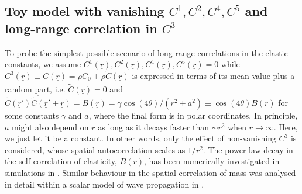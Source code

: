 \documentclass[twoside,twocolumn,9pt]{article}
\begin{document}
\subsection{Toy model with vanishing $C^1, C^2, C^4, C^5$ and long-range correlation in $C^3$}
To probe the simplest possible scenario of long-range correlations in the elastic constants, we assume $C^1(\underline{r}),C^2(\underline{r}),C^4(\underline{r}),C^5(\underline{r})=0$ while $C^3(\underline{r})\equiv C(\underline{r})=\rho C_0+\rho\tilde{C}(\underline{r})$ is expressed in terms of its mean value plus a random part, i.e. $\overline{\tilde{C}(\underline{r})}=0$ and $\overline{\tilde{C}(\underline{r}')\tilde{C}(\underline{r}'+\underline{r})}=B(\underline{r})=\gamma\cos(4\theta)/(r^2+a^2)\equiv\cos(4\theta)B(r)$ for some constants $\gamma$ and $a$, where the final form is in polar coordinates. In principle, $a$ might also depend on $\underline{r}$ as long as it decays faster than $\sim r^2$ when $r\rightarrow\infty$. Here, we just let it be a constant. In other words, only the effect of non-vanishing $C^3$ is considered, whose spatial autocorrelation scales as $1/r^2$. The power-law decay in the self-correlation of elasticity, $B(r)$, has been numerically investigated in simulations in \cite{Gelin2016}. Similar behaviour in the spatial correlation of mass was analysed in detail within a scalar model of wave propagation in \cite{John1983b}.
\end{document}
